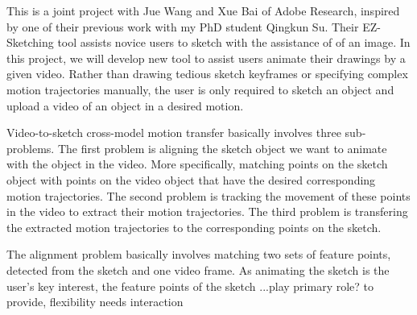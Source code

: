 This is a joint project with Jue Wang and Xue Bai of Adobe Research, inspired by one of their previous work 
with my PhD student Qingkun Su.  Their EZ-Sketching tool assists novice users to sketch with the assistance of
of an image.  In this project, we will develop new tool to assist users animate their drawings by a 
given video. Rather than drawing tedious sketch keyframes or specifying complex motion trajectories 
manually, the user is only required to sketch an object and upload a video of an object in a desired motion.

Video-to-sketch cross-model motion transfer basically involves three sub-problems.  
The first problem is aligning the sketch object we want to animate with the object in the video.
More specifically, matching points on the sketch object with points on the video object that have the 
desired corresponding motion trajectories.  The second problem is tracking the movement of these points in
the video to extract their motion trajectories. The third problem is transfering the extracted motion trajectories
to the corresponding points on the sketch.  



The alignment problem basically involves matching two sets of feature points, detected from the sketch and one 
video frame.  As animating the sketch is the user's key interest, the feature points of the sketch ...play primary
role? 
to provide, flexibility needs interaction


